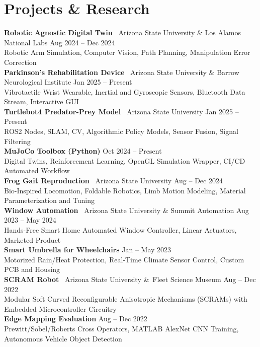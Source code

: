 \documentclass[10pt]{article}
\begin{document}
\section*{Projects \& Research}
\textbf{Robotic Agnostic Digital Twin} \textbar\ Arizona State University \& Los Alamos National Labs  \hfill Aug 2024 -- Dec 2024 \\
\hspace*{2em}Robotic Arm Simulation, Computer Vision, Path Planning, Manipulation Error Correction
\\
\textbf{Parkinson's Rehabilitation Device} \textbar\ Arizona State University \& Barrow Neurological Institute \hfill Jan 2025 -- Present \\
\hspace*{2em}Vibrotactile Wrist Wearable, Inertial and Gyroscopic Sensors, Bluetooth Data Stream, Interactive GUI
\\
\textbf{Turtlebot4 Predator-Prey Model} \textbar\ Arizona State University \hfill Jan 2025 -- Present \\
\hspace*{2em}ROS2 Nodes, SLAM, CV, Algorithmic Policy Models, Sensor Fusion, Signal Filtering
\\
\textbf{MuJoCo Toolbox (Python)} \hfill Oct 2024 -- Present \\
\hspace*{2em}Digital Twins, Reinforcement Learning, OpenGL Simulation Wrapper, CI/CD Automated Workflow
\\
\textbf{Frog Gait Reproduction} \textbar\ Arizona State University \hfill Aug -- Dec 2024 \\
\hspace*{2em}Bio-Inspired Locomotion, Foldable Robotics, Limb Motion Modeling, Material Parameterization and Tuning
\\
\textbf{Window Automation} \textbar\ Arizona State University \& Summit Automation \hfill Aug 2023 -- May 2024 \\
\hspace*{2em}Hands-Free Smart Home Automated Window Controller, Linear Actuators, Marketed Product
\\
\textbf{Smart Umbrella for Wheelchairs} \hfill Jan -- May 2023 \\
\hspace*{2em}Motorized Rain/Heat Protection, Real-Time Climate Sensor Control, Custom PCB and Housing
\\
\textbf{SCRAM Robot} \textbar\ Arizona State University \&\ Fleet Science Museum \hfill Aug -- Dec 2022 \\
\hspace*{2em}Modular Soft Curved Reconfigurable Anisotropic Mechanisms (SCRAMs) with Embedded Microcontroller Circuitry
\\
\textbf{Edge Mapping Evaluation} \hfill Aug -- Dec 2022 \\
\hspace*{2em}Prewitt/Sobel/Roberts Cross Operators, MATLAB AlexNet CNN Training, Autonomous Vehicle Object Detection
\end{document}
